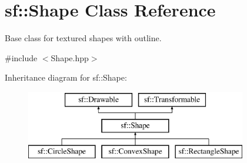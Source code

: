 \hypertarget{classsf_1_1Shape}{\section{sf\-:\-:Shape Class Reference}
\label{classsf_1_1Shape}
}


Base class for textured shapes with outline.  




{\ttfamily \#include $<$Shape.\-hpp$>$}

Inheritance diagram for sf\-:\-:Shape\-:\begin{figure}[H]
\begin{center}
\leavevmode
\includegraphics[height=3.000000cm]{classsf_1_1Shape}
\end{center}
\end{figure}
